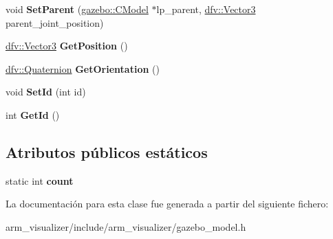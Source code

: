 \begin{DoxyCompactItemize}
\item 
\hypertarget{classgazebo_1_1CModel_aa485c643d80ee219cfd73b03ac140b28}{void {\bfseries \-Set\-Parent} (\hyperlink{classgazebo_1_1CModel}{gazebo\-::\-C\-Model} $\ast$lp\-\_\-parent, \hyperlink{classdfv_1_1Vector3}{dfv\-::\-Vector3} parent\-\_\-joint\-\_\-position)}\label{classgazebo_1_1CModel_aa485c643d80ee219cfd73b03ac140b28}

\item 
\hypertarget{classgazebo_1_1CModel_a62d969bb7d64e535a80f1c62251658fa}{\hyperlink{classdfv_1_1Vector3}{dfv\-::\-Vector3} {\bfseries \-Get\-Position} ()}\label{classgazebo_1_1CModel_a62d969bb7d64e535a80f1c62251658fa}

\item 
\hypertarget{classgazebo_1_1CModel_a1714a42e3ccfb0d54eb98c98f6b595e1}{\hyperlink{classdfv_1_1Quaternion}{dfv\-::\-Quaternion} {\bfseries \-Get\-Orientation} ()}\label{classgazebo_1_1CModel_a1714a42e3ccfb0d54eb98c98f6b595e1}

\item 
\hypertarget{classgazebo_1_1CModel_afd367af75ba60ff83dee9f126635cc10}{void {\bfseries \-Set\-Id} (int id)}\label{classgazebo_1_1CModel_afd367af75ba60ff83dee9f126635cc10}

\item 
\hypertarget{classgazebo_1_1CModel_a63f27abae6a83f0b99569ac7c6cc9cbb}{int {\bfseries \-Get\-Id} ()}\label{classgazebo_1_1CModel_a63f27abae6a83f0b99569ac7c6cc9cbb}

\end{DoxyCompactItemize}
\subsection*{\-Atributos públicos estáticos}
\begin{DoxyCompactItemize}
\item 
\hypertarget{classgazebo_1_1CModel_acfa101eb27323dac678e9a04988665a4}{static int {\bfseries count}}\label{classgazebo_1_1CModel_acfa101eb27323dac678e9a04988665a4}

\end{DoxyCompactItemize}


\-La documentación para esta clase fue generada a partir del siguiente fichero\-:\begin{DoxyCompactItemize}
\item 
arm\-\_\-visualizer/include/arm\-\_\-visualizer/gazebo\-\_\-model.\-h\end{DoxyCompactItemize}
